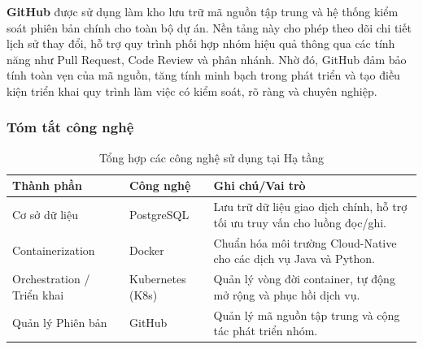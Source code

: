 \textbf{GitHub} được sử dụng làm kho lưu trữ mã nguồn tập trung và hệ thống kiểm soát phiên bản chính cho toàn bộ dự án. Nền tảng này cho phép theo dõi chi tiết lịch sử thay đổi, hỗ trợ quy trình phối hợp nhóm hiệu quả thông qua các tính năng như Pull Request, Code Review và phân nhánh. Nhờ đó, GitHub đảm bảo tính toàn vẹn của mã nguồn, tăng tính minh bạch trong phát triển và tạo điều kiện triển khai quy trình làm việc có kiểm soát, rõ ràng và chuyên nghiệp.

\subsubsection{Tóm tắt công nghệ}

\begin{table}[H]
\centering
\renewcommand{\arraystretch}{1.4} %
\caption{Tổng hợp các công nghệ sử dụng tại Hạ tầng}
\label{tab:infrastructure_summary}
\begin{tabular}{|p{3cm}|l|p{5.5cm}|} 
\hline
\textbf{Thành phần} & \textbf{Công nghệ} & \textbf{Ghi chú/Vai trò} \\ 
\hline
Cơ sở dữ liệu & PostgreSQL & Lưu trữ dữ liệu giao dịch chính, hỗ trợ tối ưu truy vấn cho luồng đọc/ghi. \\ 
\hline
Containerization & Docker & Chuẩn hóa môi trường Cloud-Native cho các dịch vụ Java và Python.\\ 
\hline
Orchestration / Triển khai & Kubernetes (K8s) & Quản lý vòng đời container, tự động mở rộng và phục hồi dịch vụ. \\ 
\hline
Quản lý Phiên bản & GitHub & Quản lý mã nguồn tập trung và cộng tác phát triển nhóm. \\ 
\hline
\end{tabular}
\end{table}
